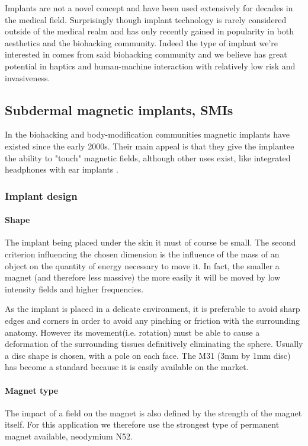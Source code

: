 \documentclass[10pt,journal,compsoc]{IEEEtran}
\begin{document}
	Implants are not a novel concept and have been used extensively for decades in the medical field. Surprisingly though implant technology is rarely considered outside of the medical realm and has only recently gained in popularity in both aesthetics and the biohacking community.
	Indeed the type of implant we're interested in comes from said biohacking community and we believe has great potential in haptics and human-machine interaction with relatively low risk and invasiveness.
	
	
	\subsection{Subdermal magnetic implants, SMIs}
		In the biohacking and body-modification communities magnetic implants have existed since the early 2000s. Their main appeal is that they give the implantee the ability to "touch" magnetic fields, although other uses exist, like integrated headphones with ear implants \cite{fougues2020book}.
		\subsubsection{Implant design} 
			\paragraph{Shape}
			The implant being placed under the skin it must of course be small. The second criterion influencing the chosen dimension is the influence of the mass of an object on the quantity of energy necessary to move it. In fact, the smaller a magnet (and therefore less massive) the more easily it will be moved by low intensity fields and higher frequencies.
			
			As the implant is placed in a delicate environment, it is preferable to avoid sharp edges and corners in order to avoid any pinching or friction with the surrounding anatomy. However its movement(i.e. rotation) must be able to cause a deformation of the surrounding tissues definitively eliminating the sphere. Usually a disc shape is chosen, with a pole on each face.
			The M31 (3mm by 1mm disc) has become a standard because it is easily available on the market.
			\paragraph{Magnet type}
			The impact of a field on the magnet is also defined by the strength of the magnet itself. For this application we therefore use the strongest type of permanent magnet available, neodymium N52.
\end{document}
